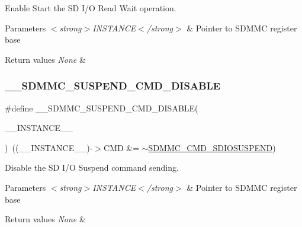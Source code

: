 Enable Start the SD I/O Read Wait operation. 


\begin{DoxyParams}{Parameters}
{\em $<$strong$>$\+I\+N\+S\+T\+A\+N\+C\+E$<$/strong$>$} & Pointer to S\+D\+M\+MC register base\\
\hline
\end{DoxyParams}

\begin{DoxyRetVals}{Return values}
{\em None} & \\
\hline
\end{DoxyRetVals}
\mbox{\label{group___s_d_m_m_c___l_l___interrupt___clock_ga5086b97bef527e383097b4843d49769a}} 
\subsubsection{\texorpdfstring{\_\_SDMMC\_SUSPEND\_CMD\_DISABLE}{\_\_SDMMC\_SUSPEND\_CMD\_DISABLE}}
{\footnotesize\ttfamily \#define \+\_\+\+\_\+\+S\+D\+M\+M\+C\+\_\+\+S\+U\+S\+P\+E\+N\+D\+\_\+\+C\+M\+D\+\_\+\+D\+I\+S\+A\+B\+LE(\begin{DoxyParamCaption}\item[{}]{\+\_\+\+\_\+\+I\+N\+S\+T\+A\+N\+C\+E\+\_\+\+\_\+ }\end{DoxyParamCaption})~((\+\_\+\+\_\+\+I\+N\+S\+T\+A\+N\+C\+E\+\_\+\+\_\+)-\/$>$C\+MD \&= $\sim$\mbox{\hyperlink{group___peripheral___registers___bits___definition_gaebb2a41639369a8c17cdb7b900b645a9}{S\+D\+M\+M\+C\+\_\+\+C\+M\+D\+\_\+\+S\+D\+I\+O\+S\+U\+S\+P\+E\+ND}})}



Disable the SD I/O Suspend command sending. 


\begin{DoxyParams}{Parameters}
{\em $<$strong$>$\+I\+N\+S\+T\+A\+N\+C\+E$<$/strong$>$} & Pointer to S\+D\+M\+MC register base\\
\hline
\end{DoxyParams}

\begin{DoxyRetVals}{Return values}
{\em None} & \\
\hline
\end{DoxyRetVals}
\mbox{\label{group___s_d_m_m_c___l_l___interrupt___clock_ga58bc9956e8a4edaffd8828923ded632a}} 
